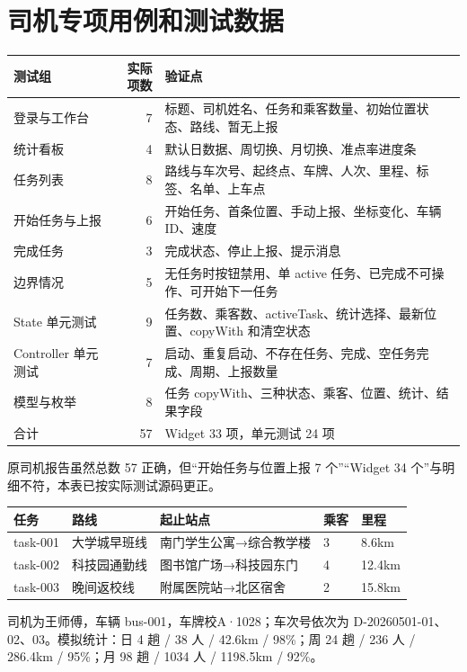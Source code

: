 \documentclass[UTF8,fontset=fandol,zihao=-4,oneside]{ctexrep}
\begin{document}
\section{司机专项用例和测试数据}
\begin{longtable}{p{4.6cm}r p{8.5cm}}
\toprule 测试组 & 实际项数 & 验证点 \\ \midrule
登录与工作台 & 7 & 标题、司机姓名、任务和乘客数量、初始位置状态、路线、暂无上报 \\
统计看板 & 4 & 默认日数据、周切换、月切换、准点率进度条 \\
任务列表 & 8 & 路线与车次号、起终点、车牌、人次、里程、标签、名单、上车点 \\
开始任务与上报 & 6 & 开始任务、首条位置、手动上报、坐标变化、车辆 ID、速度 \\
完成任务 & 3 & 完成状态、停止上报、提示消息 \\
边界情况 & 5 & 无任务时按钮禁用、单 active 任务、已完成不可操作、可开始下一任务 \\
State 单元测试 & 9 & 任务数、乘客数、activeTask、统计选择、最新位置、copyWith 和清空状态 \\
Controller 单元测试 & 7 & 启动、重复启动、不存在任务、完成、空任务完成、周期、上报数量 \\
模型与枚举 & 8 & 任务 copyWith、三种状态、乘客、位置、统计、结果字段 \\
合计 & 57 & Widget 33 项，单元测试 24 项 \\
\bottomrule
\end{longtable}
原司机报告虽然总数 57 正确，但“开始任务与位置上报 7 个”“Widget 34 个”与明细不符，本表已按实际测试源码更正。

\begin{longtable}{p{2cm}p{3.1cm}p{5.5cm}p{1.2cm}p{2.6cm}}
\toprule 任务 & 路线 & 起止站点 & 乘客 & 里程 \\ \midrule
task-001 & 大学城早班线 & 南门学生公寓→综合教学楼 & 3 & 8.6km \\
task-002 & 科技园通勤线 & 图书馆广场→科技园东门 & 4 & 12.4km \\
task-003 & 晚间返校线 & 附属医院站→北区宿舍 & 2 & 15.8km \\
\bottomrule
\end{longtable}
司机为王师傅，车辆 bus-001，车牌校A·1028；车次号依次为 D-20260501-01、02、03。模拟统计：日 4 趟 / 38 人 / 42.6km / 98\%；周 24 趟 / 236 人 / 286.4km / 95\%；月 98 趟 / 1034 人 / 1198.5km / 92\%。
\end{document}
